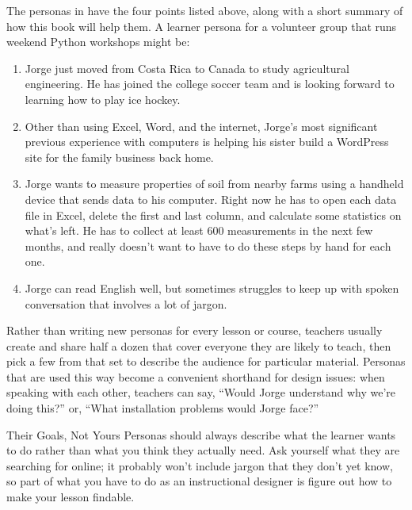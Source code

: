 The personas in  have the four points listed above,
along with a short summary of how this book will help them.
A learner persona for a volunteer group that runs weekend Python workshops might be:

\begin{enumerate}

\item
  Jorge just moved from Costa Rica to Canada to study agricultural engineering.
  He has joined the college soccer team
  and is looking forward to learning how to play ice hockey.

\item
  Other than using Excel, Word, and the internet,
  Jorge's most significant previous experience with computers
  is helping his sister build a WordPress site
  for the family business back home.

\item
  Jorge wants to measure properties of soil from nearby farms
  using a handheld device that sends data to his computer.
  Right now he has to open each data file in Excel,
  delete the first and last column,
  and calculate some statistics on what's left.
  He has to collect at least 600 measurements in the next few months,
  and really doesn't want to have to do these steps by hand for each one.

\item
  Jorge can read English well,
  but sometimes struggles to keep up with spoken conversation that involves a lot of jargon.

\end{enumerate}

Rather than writing new personas for every lesson or course,
teachers usually create and share half a dozen
that cover everyone they are likely to teach,
then pick a few from that set to describe the audience for particular material.
Personas that are used this way become a convenient shorthand for design issues:
when speaking with each other,
teachers can say,
``Would Jorge understand why we're doing this?''
or,
``What installation problems would Jorge face?''

\begin{aside}{Their Goals, Not Yours}
  Personas should always describe what the learner wants to do
  rather than what you think they actually need.
  Ask yourself what they are searching for online;
  it probably won't include jargon that they don't yet know,
  so part of what you have to do as an instructional designer is
  figure out how to make your lesson findable.
\end{aside}

